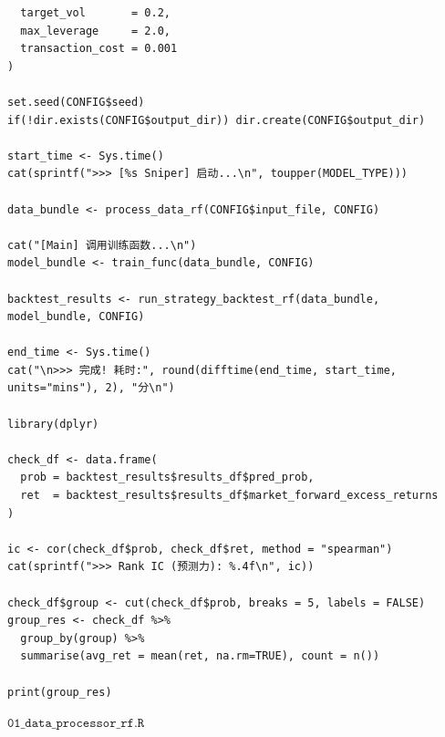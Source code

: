 \documentclass[11pt, a4paper]{article}
\begin{document}
\begin{verbatim}
  target_vol       = 0.2,
  max_leverage     = 2.0,
  transaction_cost = 0.001 
)

set.seed(CONFIG$seed)
if(!dir.exists(CONFIG$output_dir)) dir.create(CONFIG$output_dir)

start_time <- Sys.time()
cat(sprintf(">>> [%s Sniper] 启动...\n", toupper(MODEL_TYPE)))

data_bundle <- process_data_rf(CONFIG$input_file, CONFIG)

cat("[Main] 调用训练函数...\n")
model_bundle <- train_func(data_bundle, CONFIG)

backtest_results <- run_strategy_backtest_rf(data_bundle, model_bundle, CONFIG)

end_time <- Sys.time()
cat("\n>>> 完成! 耗时:", round(difftime(end_time, start_time, units="mins"), 2), "分\n")

library(dplyr)

check_df <- data.frame(
  prob = backtest_results$results_df$pred_prob,
  ret  = backtest_results$results_df$market_forward_excess_returns
)

ic <- cor(check_df$prob, check_df$ret, method = "spearman")
cat(sprintf(">>> Rank IC (预测力): %.4f\n", ic))

check_df$group <- cut(check_df$prob, breaks = 5, labels = FALSE)
group_res <- check_df %>% 
  group_by(group) %>% 
  summarise(avg_ret = mean(ret, na.rm=TRUE), count = n())

print(group_res)    
\end{verbatim}
$\texttt{01\_data\_processor\_rf.R}$
\end{document}
